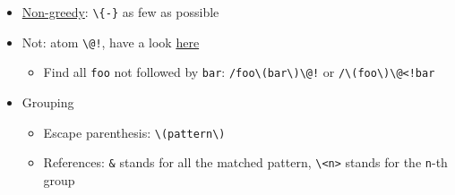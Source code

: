 \documentclass[a4paper,12pt,%
              final%
              ]{article}
\begin{document}
\begin{itemize}
\begin{itemize}
\begin{itemize}
          \item Replace: see also ``Grouping'' below. \verb|\U...\e|
            (\verb|\L...\e|): UPPERCASE (lowercase) everything until \verb|\e|.
            Similarly, \verb|\u| (\verb|\l|) UPPERCASE (lowercase) first letter only.
            (\verb|\e| is not mandatory, but necessary if you wish to terminate the
            action before the end)
          \item Flags:
            \begin{itemize}
              \item \texttt{g} every occurrences (not only the first of the line)
              \item \texttt{c} ask confirmation before replacing
              \item \texttt{e} won't issue errors if pattern is not found
              \item \texttt{I} (resp.\ \texttt{i}) case (in)sensitive
            \end{itemize}
        \end{itemize}
      \item \href{http://vimregex.com/#Non-Greedy}{Non-greedy}: \verb|\{-}| as few as possible
      \item Not: atom \verb|\@!|, have a look \href{https://vim.fandom.com/wiki/Search_for_lines_not_containing_pattern_and_other_helpful_searches}{here}
        \begin{itemize}
          \item Find all \texttt{foo} not followed by \texttt{bar}: \verb|/foo\(bar\)\@!| or \verb|/\(foo\)\@<!bar|
        \end{itemize}
      \item Grouping
        \begin{itemize}
          \item Escape parenthesis: \verb|\(pattern\)|
          \item References: \verb|&| stands for all the matched pattern, \verb|\<n>| stands for the \texttt{n}-th group
        \end{itemize}
    \end{itemize}
\end{itemize}
%
\end{document}
